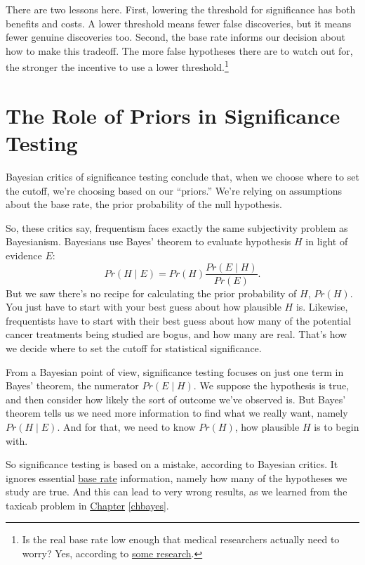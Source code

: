 \documentclass[justified]{tufte-book}
\newcommand{\given}{\mid}
\newcommand{\p}{Pr}
\theoremstyle{definition}
\theoremstyle{definition}
\theoremstyle{definition}
\theoremstyle{definition}
\theoremstyle{remark}
\begin{document}
There are two lessons here. First, lowering the threshold for significance has both benefits and costs. A lower threshold means fewer false discoveries, but it means fewer genuine discoveries too. Second, the base rate informs our decision about how to make this tradeoff. The more false hypotheses there are to watch out for, the stronger the incentive to use a lower threshold.\footnote{Is the real base rate low enough that medical researchers actually need to worry? Yes, according to \href{https://www.doi.org/10.1038/nrd3439-c1}{some research}.}

\hypertarget{the-role-of-priors-in-significance-testing}{%
\section{The Role of Priors in Significance Testing}\label{the-role-of-priors-in-significance-testing}}

Bayesian critics of significance testing conclude that, when we choose where to set the cutoff, we're choosing based on our ``priors.'' We're relying on assumptions about the base rate, the prior probability of the null hypothesis.

So, these critics say, frequentism faces exactly the same subjectivity problem as Bayesianism. Bayesians use Bayes' theorem to evaluate hypothesis \(H\) in light of evidence \(E\):
\[ \p(H \given E) = \p(H) \frac{\p(E \given H)}{\p(E)} .\]
But we saw there's no recipe for calculating the prior probability of \(H\), \(\p(H)\). You just have to start with your best guess about how plausible \(H\) is. Likewise, frequentists have to start with their best guess about how many of the potential cancer treatments being studied are bogus, and how many are real. That's how we decide where to set the cutoff for statistical significance.

From a Bayesian point of view, significance testing focuses on just one term in Bayes' theorem, the numerator \(\p(E \given H)\). We suppose the hypothesis is true, and then consider how likely the sort of outcome we've observed is. But Bayes' theorem tells us we need more information to find what we really want, namely \(\p(H \given E)\). And for that, we need to know \(\p(H)\), how plausible \(H\) is to begin with.

So significance testing is based on a mistake, according to Bayesian critics. It ignores essential \protect\hyperlink{baserate}{base rate} information, namely how many of the hypotheses we study are true. And this can lead to very wrong results, as we learned from the taxicab problem in \protect\hyperlink{chbayes}{Chapter} \ref{chbayes}.
\end{document}

